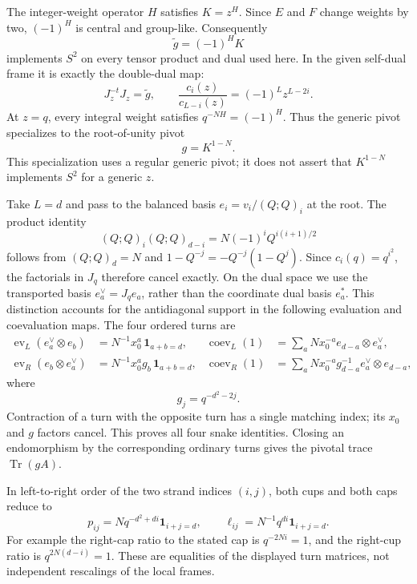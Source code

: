 The integer-weight operator \(H\) satisfies \(K=z^H\). Since \(E\)
and \(F\) change weights by two, \((-1)^H\) is central and
group-like. Consequently
\[
              \widetilde g=(-1)^HK
\]
implements \(S^2\) on every tensor product and dual used here.
In the given self-dual frame it is exactly the double-dual map:
\[
 J_z^{-t}J_z=\widetilde g,\qquad
 \frac{c_i(z)}{c_{L-i}(z)}=(-1)^Lz^{L-2i}.
\]
At \(z=q\), every integral weight satisfies \(q^{-NH}=(-1)^H\).
Thus the generic pivot specializes to the root-of-unity pivot
\begin{equation}\label{de:pivot}
                       g=K^{1-N}.
\end{equation}
This specialization uses a regular generic pivot; it does not
assert that \(K^{1-N}\) implements \(S^2\) for a generic \(z\).

Take \(L=d\) and pass to the balanced basis
\(e_i=v_i/(Q;Q)_i\) at the root. The product identity
\begin{equation}\label{de:factorial-cancellation}
 (Q;Q)_i(Q;Q)_{d-i}
       =N(-1)^iQ^{i(i+1)/2}
\end{equation}
follows from \((Q;Q)_d=N\) and
\(1-Q^{-j}=-Q^{-j}(1-Q^j)\).
Since \(c_i(q)=q^{i^2}\), the factorials in \(J_q\) therefore
cancel exactly. On the dual space we use the transported basis
\(e_a^\vee=J_qe_a\), rather than the coordinate dual basis \(e_a^*\).
This distinction accounts for the antidiagonal support in the following
evaluation and coevaluation maps. The four ordered turns are
\[
\begin{aligned}
 \operatorname{ev}_L(e_a^\vee\otimes e_b)
      &=N^{-1}x_0^a\,\mathbf1_{a+b=d},&
 \operatorname{coev}_L(1)
      &=\sum_a Nx_0^{-a}e_{d-a}\otimes e_a^\vee,\\
 \operatorname{ev}_R(e_b\otimes e_a^\vee)
      &=N^{-1}x_0^ag_b\,\mathbf1_{a+b=d},&
 \operatorname{coev}_R(1)
      &=\sum_a Nx_0^{-a}g_{d-a}^{-1}
                       e_a^\vee\otimes e_{d-a},
\end{aligned}
\]
where
\[
                       g_j=q^{-d^2-2j}.
\]
Contraction of a turn with the opposite turn has a single matching
index; its \(x_0\) and \(g\) factors cancel. This proves all four
snake identities. Closing an endomorphism by the corresponding
ordinary turns gives the pivotal trace \(\operatorname{Tr}(gA)\).

In left-to-right order of the two strand indices \((i,j)\), both cups
and both caps reduce to
\begin{equation}\label{de:root-turns}
 p_{ij}=Nq^{-d^2+di}\mathbf1_{i+j=d},
 \qquad
 \ell_{ij}=N^{-1}q^{di}\mathbf1_{i+j=d}.
\end{equation}
For example the right-cap ratio to the stated cap is
\(q^{-2Ni}=1\), and the right-cup ratio is
\(q^{2N(d-i)}=1\). These are equalities of the displayed turn matrices,
not independent rescalings of the local frames.


